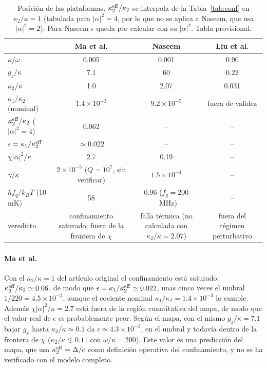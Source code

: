 \documentclass[11pt,a4paper]{article}
\theoremstyle{definition}
\begin{document}
\begin{table}[h]
\centering
\begin{tabular}{lccc}
\toprule
 & Ma et al. & Naseem & Liu et al.\\
\midrule
$\kappa/\omega$ & 0.005 & 0.001 & 0.90\\
$g_z/\kappa$ & 7.1 & 60 & 0.22\\
$\kappa_2/\kappa$ & 1.0 & 2.07 & 0.031\\
$\kappa_1/\kappa_2$ (nominal) & $1.4\times10^{-3}$ & $9.2\times10^{-5}$ & fuera de validez\\
$\kappa_2^{\rm eff}/\kappa_2$ ($|\alpha|^2=4$) & 0.062 & -- & --\\
$\epsilon=\kappa_1/\kappa_2^{\rm eff}$ & $\simeq0.022$ & -- & --\\
$\chi|\alpha|^2/\kappa$ & 2.7 & 0.19 & --\\
$\gamma/\kappa$ & $2\times10^{-5}$ ($Q=10^7$, sin verificar) & $1.5\times10^{-4}$ & --\\
$hf_q/k_BT$ (10 mK) & 58 & 0.96 ($f_q=200$~MHz) & --\\
veredicto & confinamiento saturado; fuera de la frontera de $\chi$ & falla térmica (no calculada con $\kappa_2/\kappa=2.07$) & fuera del régimen perturbativo\\
\bottomrule
\end{tabular}
\caption{Posición de las plataformas. $\kappa_2^{\rm eff}/\kappa_2$ se interpola de la Tabla~\ref{tab:conf} en $\kappa_2/\kappa=1$ (tabulada para $|\alpha|^2=4$, por lo que no se aplica a Naseem, que usa $|\alpha|^2=2$). Para Naseem $\epsilon$ queda por calcular con su $|\alpha|^2$. Tabla provisional.}
\label{tab:plat}
\end{table}

\paragraph{Ma et al.} Con el $\kappa_2/\kappa=1$ del artículo original el confinamiento está saturado: $\kappa_2^{\rm eff}/\kappa_2\simeq0.06$, de modo que $\epsilon=\kappa_1/\kappa_2^{\rm eff}\simeq0.022$, unas cinco veces el umbral $1/220=4.5\times10^{-3}$, aunque el cociente nominal $\kappa_1/\kappa_2=1.4\times10^{-3}$ lo cumple. Además $\chi|\alpha|^2/\kappa=2.7$ está fuera de la región cuantitativa del mapa, de modo que el valor real de $\epsilon$ es probablemente peor. Según el mapa, con el mismo $g_z/\kappa=7.1$ bajar $g_x$ hasta $\kappa_2/\kappa\simeq0.1$ da $\epsilon\simeq4.3\times10^{-3}$, en el umbral y todavía dentro de la frontera de $\chi$ ($\kappa_2/\kappa\lesssim0.11$ con $\omega/\kappa=200$). Este valor es una predicción del mapa, que usa $\kappa_2^{\rm eff}=\Delta/c$ como definición operativa del confinamiento, y no se ha verificado con el modelo completo.
\end{document}
